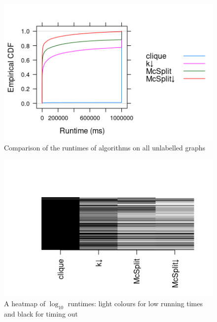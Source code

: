 \documentclass{l4proj}
\theoremstyle{definition}
\theoremstyle{remark}
\begin{document}
\begin{figure}
  \centering
  \includegraphics{images/ecdf_unlabelled.png}
  \caption{Comparison of the runtimes of algorithms on all unlabelled graphs}
  \label{fig:ecdf_unlabelled}
\end{figure}

\begin{figure}
  \centering
  \includegraphics{images/runtime_heatmap.png}
  \caption{A heatmap of $\log_{10}$ runtimes: light colours for low running
    times and black for timing out}
  \label{fig:runtime_heatmap}
\end{figure}
\end{document}
